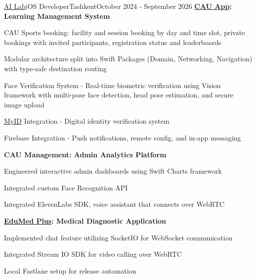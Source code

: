 \begin{resume_employer}{\href{https://www.linkedin.com/company/ai-lab-centralasian}{AI Lab}}{iOS Developer}{Tashkent}{October 2024 - September 2026}
\textbf{\href{https://apps.apple.com/uz/app/eduplus-cau/id6670467558}{CAU App}: Learning Management System}
\item
\item CAU Sports booking: facility and session booking by day and time slot, private bookings with invited participants, registration status and leaderboards
\item Modular architecture split into Swift Packages (Domain, Networking, Navigation) with type-safe destination routing
\item Face Verification System - Real-time biometric verification using Vision framework with multi-pose face detection, head pose estimation, and secure image upload
\item \href{https://docs.myid.uz/#/en/sdknew}{MyID} Integration - Digital identity verification system
\item Firebase Integration - Push notifications, remote config, and in-app messaging

\vspace{\projectspacing}

\textbf{CAU Management: Admin Analytics Platform}
\item Engineered interactive admin dashboards using Swift Charts framework
\item Integrated custom Face Recognition API
\item Integrated ElevenLabs SDK, voice assistant that connects over WebRTC

\vspace{\projectspacing}

\textbf{\href{https://apps.apple.com/uz/app/edumed-plus/id6757598366}{EduMed Plus}: Medical Diagnostic Application}
\item Implemented chat feature utilizing SocketIO for WebSocket communication
\item Integrated Stream IO SDK for video calling over WebRTC
\item Local Fastlane setup for release automation
\end{resume_employer}
